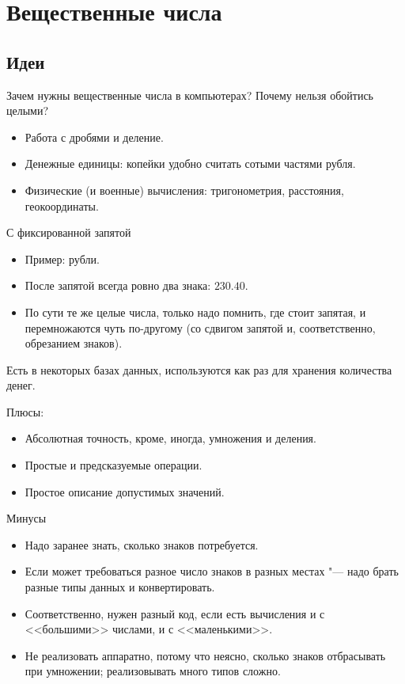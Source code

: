 \section{Вещественные числа}
\subsection{Идеи}

\begin{frame}
\end{frame}

\begin{frame}
	Зачем нужны вещественные числа в компьютерах?
	Почему нельзя обойтись целыми?

	\pause
	\begin{itemize}
		\item Работа с дробями и деление.
		\item Денежные единицы: копейки удобно считать сотыми частями рубля.
		\item Физические (и военные) вычисления: тригонометрия, расстояния, геокоординаты.
	\end{itemize}
\end{frame}

\begin{frame}{С фиксированной запятой}
	\begin{itemize}
		\item
			Пример: рубли.
		\item
			После запятой всегда ровно два знака: $230.40$.
		\item
			По сути те же целые числа, только надо помнить, где стоит запятая, и перемножаются чуть по-другому (со сдвигом запятой и, соответственно, обрезанием знаков).
	\end{itemize}
	Есть в некоторых базах данных, используются как раз для хранения количества денег.

	Плюсы:
	\begin{itemize}
		\item Абсолютная точность, кроме, иногда, умножения и деления.
		\item Простые и предсказуемые операции.
		\item Простое описание допустимых значений.
	\end{itemize}
\end{frame}

\begin{frame}{Минусы}
	\begin{itemize}
		\item
			Надо заранее знать, сколько знаков потребуется.
		\item
			Если может требоваться разное число знаков в разных местах "--- надо брать разные типы данных и конвертировать.
		\item
			Соответственно, нужен разный код, если есть вычисления и с <<большими>> числами, и с <<маленькими>>.
		\item
			Не реализовать аппаратно, потому что неясно, сколько знаков отбрасывать при умножении;
			реализовывать много типов сложно.
	\end{itemize}
\end{frame}

